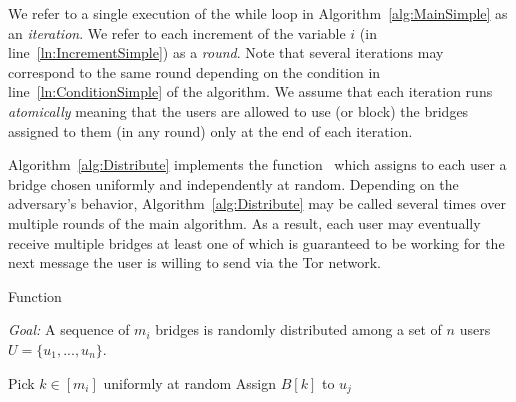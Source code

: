 We refer to a single execution of the while loop in Algorithm~\ref{alg:MainSimple} as an \emph{iteration}. We refer to each increment of the variable $i$ (in line~\ref{ln:IncrementSimple}) as a \emph{round}. Note that several iterations may correspond to the same round depending on the condition in line~\ref{ln:ConditionSimple} of the algorithm. 
We assume that each iteration runs \emph{atomically} meaning that the users are allowed to use (or block) the bridges assigned to them (in any round) only at the end of each iteration. 

Algorithm~\ref{alg:Distribute} implements the function~ which assigns to each user a bridge chosen uniformly and independently at random. Depending on the adversary's behavior, Algorithm~\ref{alg:Distribute} may be called several times over multiple rounds of the main algorithm. As a result, each user may eventually receive multiple bridges at least one of which is guaranteed to be working for the next message the user is willing to send via the Tor network.
\begin{algorithm}
	\caption{Function }
	\label{alg:Distribute}
	
	\algFont \vspace{5pt}
	\textit{Goal:} A sequence of $m_i$ bridges is randomly distributed among a set of $n$ users $U = \{u_1,...,u_n\}$.
	\begin{algorithmic}[1]
				\State Pick $k \in [m_i]$ uniformly at random 
				\State Assign $B[k]$ to $u_j$
			\EndFor
		\EndFunction
	\end{algorithmic}
\end{algorithm}

